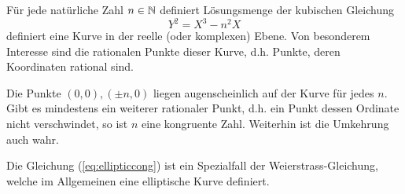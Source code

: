 Für jede natürliche Zahl $n\in{\mathbb{N}}$ definiert
Lösungsmenge der kubischen Gleichung
\begin{equation}
  \label{eq:ellipticcong}
  Y^2 = X^3-n^2X  
\end{equation}
definiert eine Kurve in der reelle (oder komplexen) Ebene. Von besonderem Interesse sind die
rationalen Punkte dieser Kurve, d.h. Punkte, deren Koordinaten
rational sind.

Die Punkte $(0,0),(\pm n,0)$ liegen augenscheinlich auf der Kurve für
jedes $n$. Gibt es mindestens ein weiterer rationaler Punkt, d.h. ein
Punkt dessen Ordinate nicht verschwindet, so ist $n$ eine kongruente
Zahl.
Weiterhin ist die Umkehrung auch wahr. 


Die Gleichung (\ref{eq:ellipticcong}) ist ein Spezialfall der
Weierstrass-Gleichung, welche im Allgemeinen eine elliptische Kurve
definiert. 


